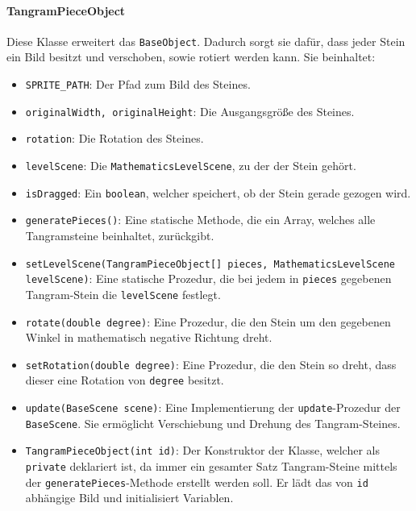 \paragraph{TangramPieceObject} Diese Klasse erweitert das \texttt{BaseObject}.
Dadurch sorgt sie dafür, dass jeder Stein ein Bild besitzt und verschoben, sowie rotiert werden kann.
Sie beinhaltet:

\begin{sloppypar}
    \begin{itemize}
        \item \texttt{SPRITE\_PATH}: Der Pfad zum Bild des Steines.
        \item \texttt{originalWidth, originalHeight}: Die Ausgangsgröße des Steines.
        \item \texttt{rotation}: Die Rotation des Steines.
        \item \texttt{levelScene}: Die \texttt{MathematicsLevelScene}, zu der der Stein gehört.
        \item \texttt{isDragged}: Ein \texttt{boolean}, welcher speichert, ob der Stein gerade gezogen wird.
        \item \texttt{generatePieces()}: Eine statische Methode, die ein Array, welches alle Tangramsteine beinhaltet, zurückgibt.
        \item \texttt{setLevelScene(TangramPieceObject[] pieces, MathematicsLevelScene levelScene)}: Eine statische Prozedur, die bei jedem in \texttt{pieces} gegebenen Tangram-Stein die \texttt{levelScene} festlegt.
        \item \texttt{rotate(double degree)}: Eine Prozedur, die den Stein um den gegebenen Winkel in mathematisch negative Richtung dreht.
        \item \texttt{setRotation(double degree)}: Eine Prozedur, die den Stein so dreht, dass dieser eine Rotation von \texttt{degree} besitzt.
        \item \texttt{update(BaseScene scene)}: Eine Implementierung der \texttt{update}-Prozedur der \texttt{BaseScene}.
            Sie ermöglicht Verschiebung und Drehung des Tangram-Steines.
        \item \texttt{TangramPieceObject(int id)}: Der Konstruktor der Klasse, welcher als \texttt{private} deklariert ist, da immer ein gesamter Satz Tangram-Steine mittels der \texttt{generatePieces}-Methode erstellt werden soll.
            Er lädt das von \texttt{id} abhängige Bild und initialisiert Variablen.
    \end{itemize}
\end{sloppypar}

